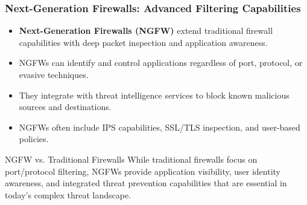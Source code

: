 \documentclass{beamer}
\begin{document}
\begin{frame}
    \frametitle{Next-Generation Firewalls: Advanced Filtering Capabilities}
    \begin{itemize}
        \item \textbf{Next-Generation Firewalls (NGFW)} extend traditional firewall capabilities with deep packet inspection and application awareness.
        \item NGFWs can identify and control applications regardless of port, protocol, or evasive techniques.
        \item They integrate with threat intelligence services to block known malicious sources and destinations.
        \item NGFWs often include IPS capabilities, SSL/TLS inspection, and user-based policies.
    \end{itemize}
    
    \begin{alertblock}{NGFW vs. Traditional Firewalls}
        While traditional firewalls focus on port/protocol filtering, NGFWs provide application visibility, user identity awareness, and integrated threat prevention capabilities that are essential in today's complex threat landscape.
    \end{alertblock}
\end{frame}
\end{document}
